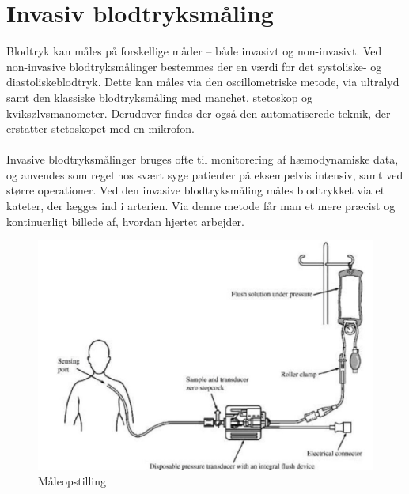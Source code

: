 \section{Invasiv blodtryksmåling}
Blodtryk kan måles på forskellige måder – både invasivt og non-invasivt. Ved non-invasive blodtryksmålinger bestemmes der en værdi for det systoliske- og diastoliskeblodtryk. Dette kan måles via den oscillometriske metode, via ultralyd samt den klassiske blodtryksmåling med manchet, stetoskop og kviksølvsmanometer. Derudover findes der også den automatiserede teknik, der erstatter stetoskopet med en mikrofon. \\\\
Invasive blodtryksmålinger bruges ofte til monitorering af hæmodynamiske data, og anvendes som regel hos svært syge patienter på eksempelvis intensiv, samt ved større operationer. Ved den invasive blodtryksmåling måles blodtrykket via et kateter, der lægges ind i arterien. Via denne metode får man et mere præcist og kontinuerligt billede af, hvordan hjertet arbejder. 

\begin{figure}[H]
	\centering
	\includegraphics[width=1\textwidth]{Figurer/Snip20151207_50}
	\caption{Måleopstilling}
\end{figure}

